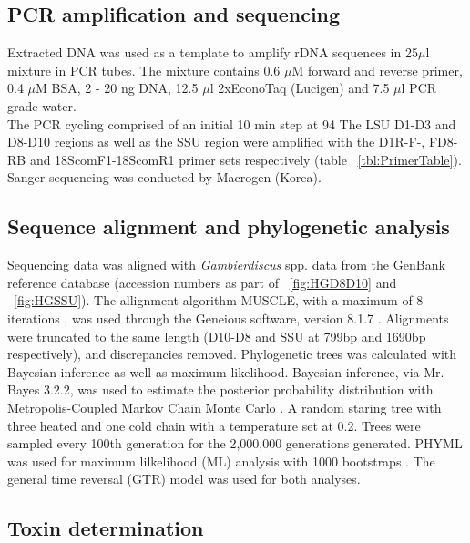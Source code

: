 \documentclass[12pt]{article}
\begin{document}
\subsection{PCR amplification and sequencing}
Extracted DNA was used as a template to amplify rDNA sequences in 25$\mu$l mixture in PCR tubes. The mixture contains 0.6 $\mu$M forward and reverse primer, 0.4 $\mu$M BSA, 2 - 20 ng DNA, 12.5 $\mu$l 2xEconoTaq (Lucigen) and 7.5 $\mu$l PCR grade water.\\
The PCR cycling comprised of an initial 10 min step at 94
The LSU D1-D3  and D8-D10 regions as well as the SSU region were amplified with the D1R-F-, FD8-RB and 18ScomF1-18ScomR1 primer sets respectively (table ~\ref{tbl:PrimerTable}).\\
Sanger sequencing was conducted by Macrogen (Korea).


\subsection{Sequence alignment and phylogenetic analysis}
Sequencing data was aligned with \emph{Gambierdiscus} spp. data from the GenBank reference database (accession numbers as part of ~\ref{fig:HGD8D10} and ~\ref{fig:HGSSU}). The allignment algorithm MUSCLE, with a maximum of 8 iterations \cite{edgar2004muscle}, was used through the Geneious software, version 8.1.7 \cite{kearse2012geneious}. Alignments were truncated to the same length (D10-D8 and SSU at 799bp and 1690bp respectively), and discrepancies removed.
Phylogenetic trees was calculated with Bayesian inference as well as maximum likelihood. Bayesian inference, via Mr. Bayes 3.2.2, was used to estimate the posterior probability distribution with Metropolis-Coupled Markov Chain Monte Carlo \cite{ronquist2003mrbayes}. A random staring tree with three heated and one cold chain with a temperature set at 0.2. Trees were sampled every 100th generation for the 2,000,000 generations generated.
PHYML was used for maximum lilkelihood (ML) analysis with 1000 bootstraps \cite{guindon2003simple}.
The general time reversal (GTR) model was used for both analyses.\\

\subsection{Toxin determination}
\end{document}
